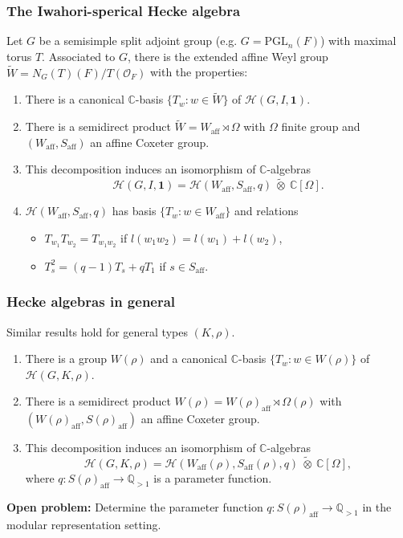 \documentclass{beamer}
\newcommand{\PGL}{\mathrm{PGL}}
\newcommand{\aff}{\mathrm{aff}}
\newcommand{\CC}{\mathbb{C}}
\newcommand{\QQ}{\mathbb{Q}}
\newcommand{\cH}{\mathcal{H}}
\theoremstyle{plain}
\begin{document}
\begin{frame}
    \frametitle{The Iwahori-sperical Hecke algebra}
    Let $G$ be a semisimple split adjoint group (e.g. $G=\PGL_n(F)$) with maximal torus $T$. Associated to $G$, there is the extended affine Weyl group $\widetilde{W}=N_G(T)(F)/T(\mathcal{O}_F)$ with the properties:
    \begin{enumerate}
        \item There is a canonical $\CC$-basis $\{T_w:w\in\widetilde{W}\}$ of $\cH(G,I,\mathbf{1})$.
        \item There is a semidirect product $\widetilde{W}=W_{\aff}\rtimes\Omega$ with $\Omega$ finite group and $(W_{\aff},S_{\aff})$ an affine Coxeter group.
        \item This decomposition induces an isomorphism of $\CC$-algebras
        \[\cH(G,I,\mathbf{1})=\cH(W_{\aff},S_{\aff},q)\ \tilde{\otimes}\ \CC[\Omega].\]
        \item $\cH(W_{\aff},S_{\aff},q)$ has basis $\{T_w:w\in W_{\aff}\}$ and relations
        \begin{itemize}
            \item $T_{w_1}T_{w_2}=T_{w_1w_2}$ if $l(w_1w_2)=l(w_1)+l(w_2)$,
            \item $T_s^2=(q-1)T_s+qT_1$ if $s\in S_{\aff}$.
        \end{itemize}
    \end{enumerate}
\end{frame}

\begin{frame}
    \frametitle{Hecke algebras in general}
    Similar results hold for general types $(K,\rho)$. 
    \begin{enumerate}
        \item There is a group $W(\rho)$ and a canonical $\CC$-basis $\{T_w:w\in W(\rho)\}$ of $\cH(G,K,\rho)$.
        \item There is a semidirect product $W(\rho)=W(\rho)_{\aff}\rtimes\Omega(\rho)$ with $(W(\rho)_{\aff},S(\rho)_{\aff})$ an affine Coxeter group.
        \item This decomposition induces an isomorphism of $\CC$-algebras
        \[\cH(G,K,\rho)=\cH(W_{\aff}(\rho),S_{\aff}(\rho),q)\ \tilde{\otimes}\ \CC[\Omega],\]
        where $q:S(\rho)_{\aff}\rightarrow\QQ_{>1}$ is a parameter function.
    \end{enumerate}
    \vspace{0.3cm}
    \textbf{Open problem:} Determine the parameter function $q:S(\rho)_{\aff}\rightarrow\QQ_{>1}$ in the modular representation setting. 
\end{frame}
\end{document}
